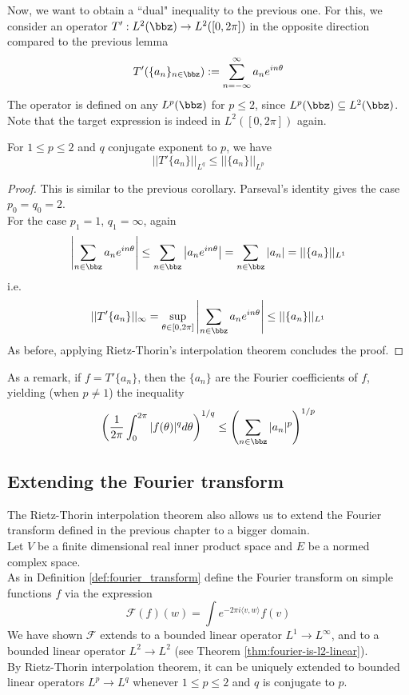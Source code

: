 Now, we want to obtain a ``dual" inequality to the previous one. For this, we consider an operator $T':L^2(\bbz) \to L^2([0, 2\pi])$ in the opposite direction compared to the previous lemma
\[ T' (\{a_n\}_{n\in \bbz}) := \sum_{n=-\infty}^{\infty} a_n e^{in\theta} \]
The operator is defined on any $L^p(\bbz)$ for $p\leq 2$, since $L^p(\bbz) \subseteq L^2(\bbz)$.
Note that the target expression is indeed in $L^2([0, 2\pi])$ again.

\begin{lemma}
    \label{lem:hausdorff_young_dual}
    \uses{}
    \lean{}
    For $1\leq p \leq 2$ and $q$ conjugate exponent to $p$, we have
    \[ ||T' \{a_n\}||_{L^q} \leq ||\{a_n\}||_{L^p} \]

    \end{lemma}
      \begin{proof}
      This is similar to the previous corollary. Parseval's identity gives the case $p_0=q_0=2$.\\
      For the case $p_1=1$, $q_1=\infty$, again
      \[ \left| \sum_{n\in \bbz} a_n e^{in\theta} \right| \leq \sum_{n\in \bbz} \left| a_n e^{in\theta} \right| = \sum_{n\in \bbz} |a_n| = ||\{a_n\}||_{L^1} \]
      i.e.
      \[ ||T'\{a_n\}||_{\infty} = \sup_{\theta \in [0, 2\pi]}  \left| \sum_{n\in \bbz} a_n e^{in\theta} \right| \leq ||\{a_n\}||_{L^1}  \]
      As before, applying Rietz-Thorin's interpolation theorem concludes the proof.
    \end{proof}

As a remark, if $f= T'\{a_n\}$, then the $\{a_n\}$ are the Fourier coefficients of $f$, yielding (when $p\neq 1$) the inequality
\[ \left( \frac{1}{2\pi} \int_0^{2\pi} |f(\theta)|^q d\theta \right)^{1/q} \leq \left( \sum_{n\in \bbz} |a_n|^p \right)^{1/p} \]

\subsection{Extending the Fourier transform}
The Rietz-Thorin interpolation theorem also allows us to extend the Fourier transform defined in the previous chapter to a bigger domain.\\
Let $V$ be a finite dimensional real inner product space and $E$ be a normed complex space.\\
As in Definition \ref{def:fourier_transform} define the Fourier transform on simple functions $f$ via the expression
\[ \mathcal{F} (f)(w) = \int e^{-2\pi i \langle v, w \rangle } f(v) \]
We have shown $\mathcal{F}$ extends to a bounded linear operator $L^1 \to L^{\infty}$, and to a bounded linear operator $L^2 \to L^2$ (see Theorem \ref{thm:fourier-is-l2-linear}).\\
By Rietz-Thorin interpolation theorem, it can be uniquely extended to bounded linear operators $L^p \to L^q$
whenever $1\leq p \leq 2$ and $q$ is conjugate to $p$.

